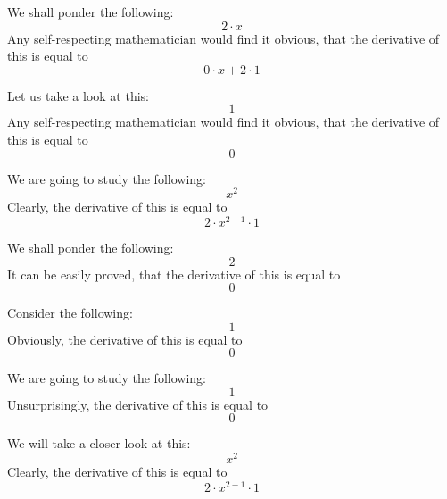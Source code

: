\documentclass{article}
\begin{document}
We shall ponder the following:
\begin{equation}
2 \cdot x 
\end{equation}
Any self-respecting mathematician would find it obvious, that the derivative of this is equal to
\begin{equation}
0 \cdot x + 2 \cdot 1 
\end{equation}

Let us take a look at this:
\begin{equation}
1 
\end{equation}
Any self-respecting mathematician would find it obvious, that the derivative of this is equal to
\begin{equation}
0 
\end{equation}

We are going to study the following:
\begin{equation}
x ^{2 } 
\end{equation}
Clearly, the derivative of this is equal to
\begin{equation}
2 \cdot x ^{2 - 1 } \cdot 1 
\end{equation}

We shall ponder the following:
\begin{equation}
2 
\end{equation}
It can be easily proved, that the derivative of this is equal to
\begin{equation}
0 
\end{equation}

Consider the following:
\begin{equation}
1 
\end{equation}
Obviously, the derivative of this is equal to
\begin{equation}
0 
\end{equation}

We are going to study the following:
\begin{equation}
1 
\end{equation}
Unsurprisingly, the derivative of this is equal to
\begin{equation}
0 
\end{equation}

We will take a closer look at this:
\begin{equation}
x ^{2 } 
\end{equation}
Clearly, the derivative of this is equal to
\begin{equation}
2 \cdot x ^{2 - 1 } \cdot 1 
\end{equation}
\end{document}
